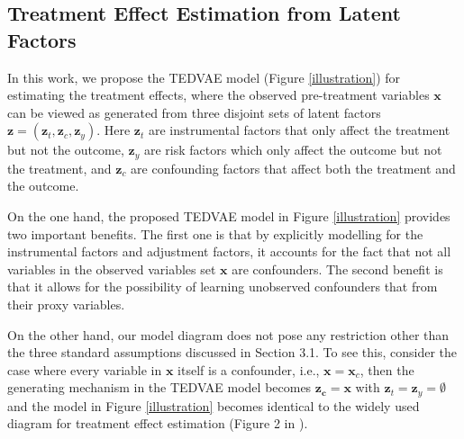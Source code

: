 \documentclass[letterpaper]{article} %
\begin{document}
\subsection*{Treatment Effect Estimation from Latent Factors}
%
%
%


In this work, we propose the TEDVAE model (Figure \ref{illustration}) for estimating the treatment effects, where the observed pre-treatment variables $\mathbf{x}$ can be viewed as generated from three disjoint sets of latent factors $\mathbf{z} = (\mathbf{z}_t,\mathbf{z}_c, \mathbf{z}_y)$.
Here $\mathbf{z}_t$ are instrumental factors that only affect the treatment but not the outcome,
$\mathbf{z}_y$ are risk factors which only affect the outcome but not the treatment,
and $\mathbf{z}_c$ are confounding factors that affect both the treatment and the outcome.

On the one hand, the proposed TEDVAE model in Figure \ref{illustration} provides two important benefits. The first one is that by explicitly modelling for the instrumental factors and adjustment factors, it accounts for the fact that not all variables in the observed variables set $\mathbf{x}$ are confounders. The second benefit is that it allows for the possibility of learning unobserved confounders that from their proxy variables.

On the other hand, our model diagram does not pose any restriction other than the three standard assumptions discussed in Section 3.1.
To see this, consider the case where every variable in $\mathbf{x}$ itself is a confounder, i.e., $\mathbf{x}=\mathbf{x}_c$, then the generating mechanism in the TEDVAE model becomes $\mathbf{z_c} = \mathbf{x}$ with $\mathbf{z}_t=\mathbf{z}_y=\emptyset$ and the model in Figure \ref{illustration} becomes identical to the widely used diagram for treatment effect estimation (Figure 2 in \cite{Imbens2019}).
\end{document}
